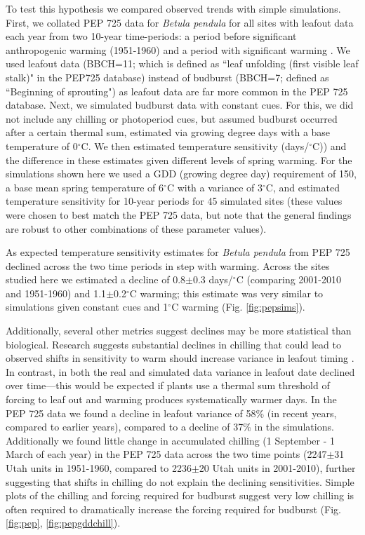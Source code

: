 \documentclass{article}
\begin{document}
\par To test this hypothesis we compared observed trends with simple simulations. First, we collated PEP 725 data \citep{Templ2018} for \emph{Betula pendula} for all sites with leafout data each year from two 10-year time-periods: a period before significant anthropogenic warming (1951-1960) and a period with significant warming \citep[2001-2010, see][]{IPCC:2014sm}. We used leafout data (BBCH=11; which is defined as ``leaf unfolding (first visible leaf stalk)" in the PEP725 database) instead of budburst (BBCH=7; defined as ``Beginning of sprouting") as leafout data are far more common in the PEP 725 database. Next, we simulated budburst data with constant cues. For this, we did not include any chilling or photoperiod cues, but assumed budburst occurred after a certain thermal sum, estimated via growing degree days with a base temperature of 0$^{\circ}$C. We then estimated temperature sensitivity (days/$^{\circ}$C)) and the difference in these estimates given different levels of spring warming. For the simulations shown here we used a GDD (growing degree day) requirement of 150, a base mean spring temperature of 6$^{\circ}$C with a variance of 3$^{\circ}$C, and estimated temperature sensitivity for 10-year periods for 45 simulated sites (these values were chosen to best match the PEP 725 data, but note that the general findings are robust to other combinations of these parameter values).

\par As expected temperature sensitivity estimates for \emph{Betula pendula} from PEP 725 declined across the two time periods in step with warming. Across the sites studied here we estimated a decline of 0.8$\pm$0.3 days/$^{\circ}$C (comparing 2001-2010 and 1951-1960) and 1.1$\pm$0.2$^{\circ}$C warming; this estimate was very similar to simulations given constant cues and 1$^{\circ}$C warming (Fig. \ref{fig:pepsims}). 

\par Additionally, several other metrics suggest declines may be more statistical than biological. Research suggests substantial declines in chilling that could lead to observed shifts in sensitivity to warm should increase variance in leafout timing \citep{ford2016}. In contrast, in both the real and simulated data variance in leafout date declined over time---this would be expected if plants use a thermal sum threshold of forcing to leaf out and warming produces systematically warmer days. In the PEP 725 data we found a decline in leafout variance of 58\% (in recent years, compared to earlier years), compared to a decline of 37\% in the simulations. Additionally we found little change in accumulated chilling (1 September - 1 March of each year) in the PEP 725 data across the two time points (2247$\pm$31 Utah units in 1951-1960, compared to 2236$\pm$20 Utah units in 2001-2010), further suggesting that shifts in chilling do not explain the declining sensitivities. Simple plots of the chilling and forcing required for budburst suggest very low chilling is often required to dramatically increase the forcing required for budburst (Fig. \ref{fig:pep}, \ref{fig:pepgddchill}). 
\end{document}
